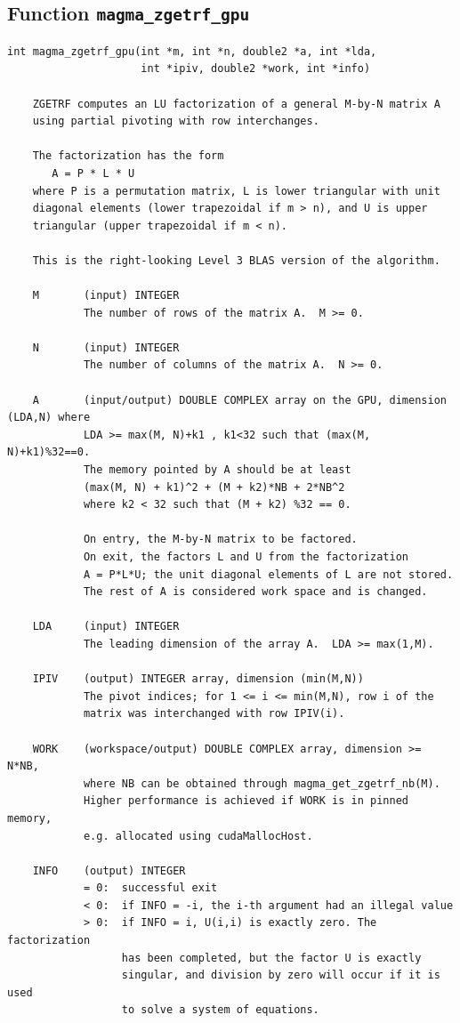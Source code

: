 \documentclass[10pt]{book}
\begin{document}
\newpage
\subsection{Function {\tt {\bf magma\_zgetrf\_gpu}}}
\begin{verbatim}
int magma_zgetrf_gpu(int *m, int *n, double2 *a, int *lda, 
                     int *ipiv, double2 *work, int *info)
   
    ZGETRF computes an LU factorization of a general M-by-N matrix A   
    using partial pivoting with row interchanges.   

    The factorization has the form   
       A = P * L * U   
    where P is a permutation matrix, L is lower triangular with unit   
    diagonal elements (lower trapezoidal if m > n), and U is upper   
    triangular (upper trapezoidal if m < n).   

    This is the right-looking Level 3 BLAS version of the algorithm.   

    M       (input) INTEGER   
            The number of rows of the matrix A.  M >= 0.   

    N       (input) INTEGER   
            The number of columns of the matrix A.  N >= 0.   

    A       (input/output) DOUBLE COMPLEX array on the GPU, dimension (LDA,N) where
            LDA >= max(M, N)+k1 , k1<32 such that (max(M, N)+k1)%32==0.
            The memory pointed by A should be at least 
            (max(M, N) + k1)^2 + (M + k2)*NB + 2*NB^2
            where k2 < 32 such that (M + k2) %32 == 0.
                 
            On entry, the M-by-N matrix to be factored.   
            On exit, the factors L and U from the factorization   
            A = P*L*U; the unit diagonal elements of L are not stored.   
            The rest of A is considered work space and is changed.

    LDA     (input) INTEGER   
            The leading dimension of the array A.  LDA >= max(1,M).   

    IPIV    (output) INTEGER array, dimension (min(M,N))   
            The pivot indices; for 1 <= i <= min(M,N), row i of the   
            matrix was interchanged with row IPIV(i).   

    WORK    (workspace/output) DOUBLE COMPLEX array, dimension >= N*NB,
            where NB can be obtained through magma_get_zgetrf_nb(M).
            Higher performance is achieved if WORK is in pinned memory, 
            e.g. allocated using cudaMallocHost.

    INFO    (output) INTEGER   
            = 0:  successful exit   
            < 0:  if INFO = -i, the i-th argument had an illegal value   
            > 0:  if INFO = i, U(i,i) is exactly zero. The factorization   
                  has been completed, but the factor U is exactly   
                  singular, and division by zero will occur if it is used   
                  to solve a system of equations.   
\end{verbatim}
\end{document}
